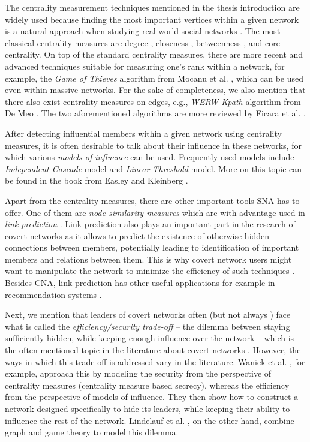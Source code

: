 The centrality measurement techniques mentioned in the thesis introduction are widely used because
finding the most important vertices within a given network is a natural approach when
studying real-world social networks \cite{Crescenzi2016}.
The most classical centrality measures are degree \cite{Shaw1954}, closeness \cite{Beauchamp1965},
betweenness \cite{Anthonisse1971,Freeman1977}, and core \cite{Seidman1983} centrality.
On top of the standard centrality measures, there are more recent and advanced techniques suitable for measuring one's rank within a network,
for example, the \emph{Game of Thieves} algorithm from Mocanu et al. \cite{Mocanu2018}, which can be used even within massive networks.
For the sake of completeness, we also mention that there also exist centrality measures on edges, e.g.,
\emph{WERW-Kpath} algorithm from {De Meo} \cite{DeMeo2013}.
The two aforementioned algorithms are more reviewed by Ficara et al. \cite{Ficara2021}.

After detecting influential members within a given network using centrality measures,
it is often desirable to talk about their influence in these networks, for which
various \emph{models of influence} can be used.
Frequently used models include \emph{Independent Cascade} model and \emph{Linear Threshold} model.
More on this topic can be found in the book from Easley and Kleinberg \cite{Easley2010}.

Apart from the centrality measures, there are other important tools SNA has to offer.
One of them are \emph{node similarity measures} which are with advantage used in \emph{link prediction} \cite{Zhou2009,Wang2015}.
Link prediction also plays an important part in the research of covert networks
as it allows to predict the existence of otherwise hidden connections between members, potentially leading to
identification of important members and relations between them.
This is why covert network users might want to manipulate the network to minimize the efficiency of such techniques \cite{Zhou2019}.
Besides CNA, link prediction has other useful applications for example in recommendation systems \cite{Huang2005,Talasu2017}.

Next, we mention that leaders of covert networks often (but not always \cite{Fatih2012}) face what is called
the \emph{efficiency/security trade-off} \cite{Morselli2007} --
the dilemma between staying sufficiently hidden, while keeping enough influence over the network --
which is the often-mentioned topic in the literature about covert networks \cite{Waniek2017,Lindelauf2009,Crossley2012}.
However, the ways in which this trade-off is addressed vary in the literature.
Waniek et al. \cite{Waniek2017}, for example, approach this by modeling the security from the perspective of
centrality measures (centrality measure based secrecy), whereas the efficiency from the perspective of models of influence.
They then show how to construct a network designed specifically to hide its leaders, while
keeping their ability to influence the rest of the network.
Lindelauf et al. \cite{Lindelauf2009}, on the other hand, combine graph and game theory to model this dilemma.

